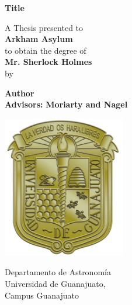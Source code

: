 \begin{titlepage}
    \begin{center}
        \vspace*{1cm}
        
        \Huge
        \textbf{Title}
        \vspace{1.5cm}
        
        \Large
         A Thesis presented to\\
         \LARGE
         \textbf{Arkham Asylum}\\
        \large 
        to obtain the degree of\\
        \LARGE
        \textbf{Mr. Sherlock Holmes}\\ 
        \large
        by
        
        \LARGE
        \textbf{Author}\\
        \vfill
        \LARGE
        \textbf{Advisors:}
        \textbf{Moriarty and Nagel}
        
        
        \vspace{0.8cm}
        
        \includegraphics[width=0.4\textwidth]{images/UGTO.png}
        
        \Large
        Departamento de Astronomía\\
        Universidad de Guanajuato,\\
        Campus Guanajuato
    \end{center}
\end{titlepage}
